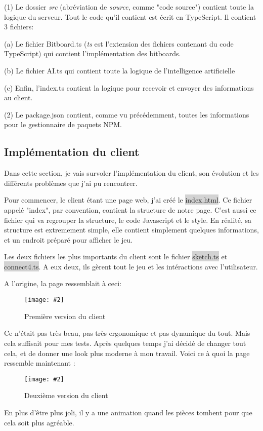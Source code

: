 \documentclass[a4paper]{article}
\newcommand{\img}[3][]{
    \begin{figure}[H]
        \centering
        \texttt{[image: \#2]}
        \caption{#1}    
    \end{figure}
}
\newcommand{\inlinecode}[1]{\colorbox{lightgray}{#1}}
\begin{document}
	(1) Le dossier \textit{src} (abréviation de \textit{source}, comme "code source") contient toute la logique du serveur. Tout le code qu'il contient est écrit en TypeScript. Il contient 3 fichiers:
	    
	\indent\indent(a) Le fichier Bitboard.ts (\textit{ts} est l'extension des fichiers contenant du code TypeScript) qui contient l'implémentation des bitboards.

	\indent\indent(b) Le fichier AI.ts qui contient toute la logique de l'intelligence artificielle

	\indent\indent(c) Enfin, l'index.ts contient la logique pour recevoir et envoyer des informations au client.

	(2) Le package.json contient, comme vu précédemment, toutes les informations pour le gestionnaire de paquets NPM.

\subsection{Implémentation du client}    

    Dans cette section, je vais survoler l'implémentation du client, son évolution et les différents problèmes que j'ai pu rencontrer.

    Pour commencer, le client étant une page web, j'ai créé le \inlinecode{index.html}. Ce fichier appelé "index", par convention, contient la structure de notre page. C'est aussi ce fichier qui va regrouper la structure, le code Javascript et le style. En réalité, sa structure est extremement simple, elle contient simplement quelques informations, et un endroit préparé pour afficher le jeu.

    Les deux fichiers les plus importants du client sont le fichier \inlinecode{sketch.ts} et \inlinecode{connect4.ts}. A eux deux, ils gèrent tout le jeu et les intéractions avec l'utilisateur.

    A l'origine, la page ressemblait à ceci:
    \img[Première version du client]{Images/FirstClientPreview.png}{0.8}

    Ce n'était pas très beau, pas très ergonomique et pas dynamique du tout. Mais cela suffisait pour mes tests. Après quelques temps j'ai décidé de changer tout cela, et de donner une look plus moderne à mon travail. Voici ce à quoi la page ressemble maintenant :
    \img[Deuxième version du client]{Images/SecondClientPreview.png}{0.8}
    En plus d'être plus joli, il y a une animation quand les pièces tombent pour que cela soit plus agréable.
\end{document}
